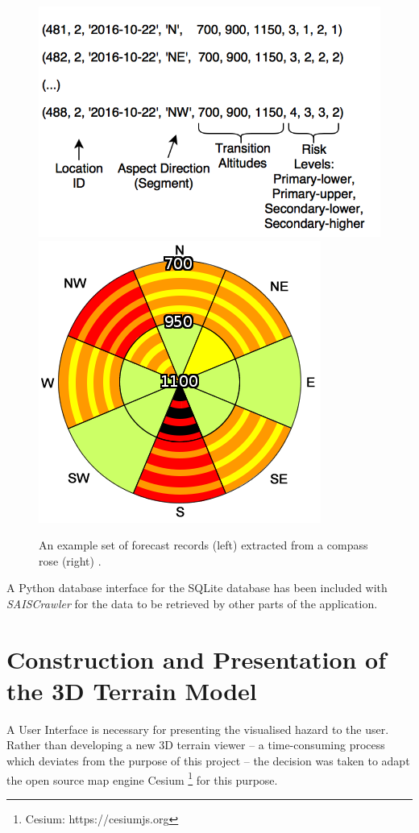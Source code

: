 \documentclass[11pt, oneside]{article}
\begin{document}
		\begin{figure}[h]
		\centering
		\includegraphics[scale=0.3]{SQLite.png}
		\includegraphics[scale=0.5]{DangerousRose.png}
		\caption{\label{fig:sqlite}An example set of forecast records (left) extracted from a compass rose (right) \cite{sais}.}
		\end{figure}
		
		A Python database interface for the SQLite database has been included with \textit{SAISCrawler} for the data to be retrieved by other parts of the application.

\section{Construction and Presentation of the 3D Terrain Model}

	A User Interface is necessary for presenting the visualised hazard to the user. Rather than developing a new 3D terrain viewer -- a time-consuming process which deviates from the purpose of this project -- the decision was taken to adapt the open source map engine Cesium \footnote{Cesium: https://cesiumjs.org} for this purpose.
	
\end{document}
